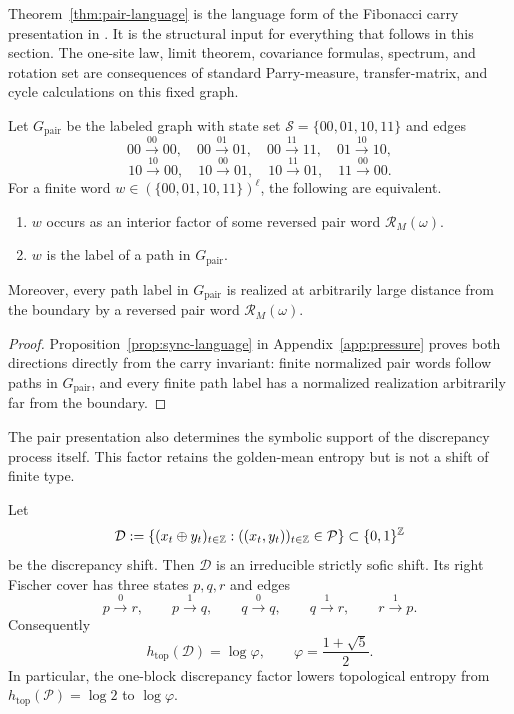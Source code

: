 Theorem~\ref{thm:pair-language} is the language form of the Fibonacci carry presentation in . It is the structural input for everything that follows in this section. The one-site law, limit theorem, covariance formulas, spectrum, and rotation set are consequences of standard Parry-measure, transfer-matrix, and cycle calculations on this fixed graph.

\begin{theorem}\label{thm:pair-language}
Let \(G_{\mathrm{pair}}\) be the labeled graph with state set \(\mathcal{S}=\{00,01,10,11\}\) and edges
\[
00 \xrightarrow{00} 00,\quad
00 \xrightarrow{01} 01,\quad
00 \xrightarrow{11} 11,\quad
01 \xrightarrow{10} 10,
\]
\[
10 \xrightarrow{10} 00,\quad
10 \xrightarrow{00} 01,\quad
10 \xrightarrow{11} 01,\quad
11 \xrightarrow{00} 00.
\]
For a finite word \(w\in(\{00,01,10,11\})^\ell\), the following are equivalent.
\begin{enumerate}
\item[(i)] \(w\) occurs as an interior factor of some reversed pair word \(\mathcal{R}_M(\omega)\).
\item[(ii)] \(w\) is the label of a path in \(G_{\mathrm{pair}}\).
\end{enumerate}
Moreover, every path label in \(G_{\mathrm{pair}}\) is realized at arbitrarily large distance from the boundary by a reversed pair word \(\mathcal{R}_M(\omega)\).
\end{theorem}

\begin{proof}
Proposition~\ref{prop:sync-language} in Appendix~\ref{app:pressure} proves both directions directly from the carry invariant: finite normalized pair words follow paths in \(G_{\mathrm{pair}}\), and every finite path label has a normalized realization arbitrarily far from the boundary.
\end{proof}

The pair presentation also determines the symbolic support of the
discrepancy process itself.  This factor retains the golden-mean entropy but
is not a shift of finite type.

\begin{theorem}
\label{thm:discrepancy-fischer}
Let
\[
\mathcal D
:=
\left\{(x_t\oplus y_t)_{t\in\mathbb{Z}}:
((x_t,y_t))_{t\in\mathbb{Z}}\in\mathcal P\right\}
\subset\{0,1\}^{\mathbb{Z}}
\]
be the discrepancy shift.  Then \(\mathcal D\) is an irreducible strictly
sofic shift.  Its right Fischer cover has three states \(p,q,r\) and edges
\[
p\xrightarrow{0}r,\qquad p\xrightarrow{1}q,\qquad
q\xrightarrow{0}q,\qquad q\xrightarrow{1}r,\qquad
r\xrightarrow{1}p.
\]
Consequently
\[
h_{\mathrm{top}}(\mathcal D)=\log\varphi,
\qquad
\varphi=\frac{1+\sqrt5}{2}.
\]
In particular, the one-block discrepancy factor lowers topological entropy
from \(h_{\mathrm{top}}(\mathcal P)=\log 2\) to \(\log\varphi\).
\end{theorem}

